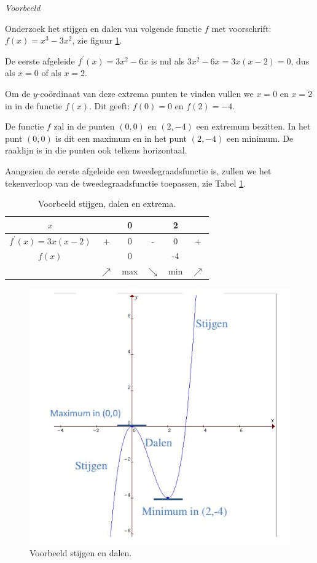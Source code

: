 \emph{Voorbeeld}

\noindent Onderzoek het stijgen en dalen van volgende functie $f$ met voorschrift: $f(x)=x^{3}-3x^{2}$, zie figuur \ref{fig:vb2}.

\noindent De eerste afgeleide $f^{'}(x)=3x^{2}-6x$ is nul als $3x^{2}-6x=3x(x-2)=0$, dus als $x=0$ of als $x=2$.

\noindent Om de $y$-co\"ordinaat van deze extrema punten te vinden
vullen we $x=0$ en $x=2$ in in de functie $f(x)$. Dit geeft: $f(0)=0$
en $f(2)=-4$.

\noindent De functie $f$ zal in de punten $(0,0)$ en $(2,-4)$ een
extremum bezitten. In het punt $(0,0)$ is dit een maximum en in het
punt $(2,-4)$ een minimum. De raaklijn is in die punten ook telkens
horizontaal.

\noindent Aangezien de eerste afgeleide een tweedegraadsfunctie is,
zullen we het tekenverloop van de tweedegraadsfunctie toepassen, zie Tabel \ref{tab:stijgen}.

\begin{table}
	\centering
	\begin{tabular}{c||c|c|c|c|c}
		$x$ &  & 0 &  & 2 & \tabularnewline
		\hline 
		$f^{'}(x)=3x(x-2)$ & + & 0 & - & 0 & + \\
		\hline 
		$f(x)$ &  & 0 &  & -4 & \\
		& $\nearrow$ & max & $\searrow$ & min & $\nearrow$ \\
	\end{tabular}
\caption{Voorbeeld stijgen, dalen en extrema.}
\label{tab:stijgen}
\end{table}

\begin{figure}[h]
\centering{}\includegraphics[width=.7\linewidth]{2_elem_rekenvaardigheden_B/inputs/verloop_vb2.jpg}
\caption{Voorbeeld stijgen en dalen.}
\label{fig:vb2}
\end{figure}

